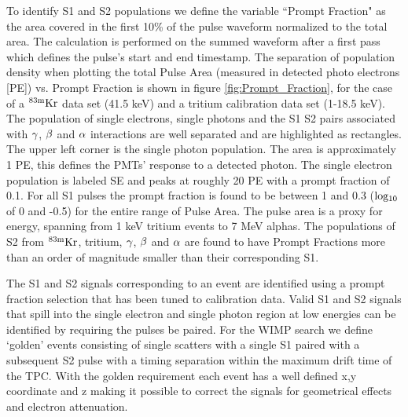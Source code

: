 To identify S1 and S2 populations we define the variable ``Prompt Fraction" as the area covered in the first 10\% of the pulse waveform normalized to the total area. The calculation is performed on the summed waveform after a first pass which defines the pulse's start and end timestamp. 
The separation of population density when plotting the total Pulse Area (measured in detected photo electrons [PE]) vs. Prompt Fraction is shown in figure \ref{fig:Prompt_Fraction},  for the case of a $\rm ^{83m}Kr$ data set (41.5 keV) and a tritium calibration data set (1-18.5 keV). The population of single electrons, single photons and the S1 S2 pairs associated with $\rm \gamma$, $\rm \beta$ and $\rm \alpha$ interactions are well separated and are highlighted as rectangles. The upper left corner is the single photon population. The area is approximately 1 PE, this defines the PMTs' response to a detected photon. The single electron population is labeled SE and peaks at roughly 20 PE with a prompt fraction of 0.1. For all S1 pulses the prompt fraction is found to be between 1 and 0.3 ($\rm log_{10}$ of 0 and -0.5) for the entire range of Pulse Area. The pulse area is a proxy for energy, spanning from 1 keV tritium events to 7 MeV alphas. The populations of S2 from $\rm^{83m}Kr$, tritium, $\rm \gamma$, $\rm \beta$ and $\rm \alpha$ are found to have Prompt Fractions more than an order of magnitude smaller than their corresponding S1. 


The S1 and S2 signals corresponding to an event are identified using a prompt fraction selection that has been tuned to calibration data. Valid S1 and S2 signals that spill into the single electron and single photon region at low energies can be identified by requiring the pulses be paired. For the WIMP search we define `golden' events consisting of single scatters with a single S1 paired with a subsequent S2 pulse with a timing separation within the maximum drift time of the TPC. With the golden requirement each event has a well defined x,y coordinate and z making it possible to correct the signals for geometrical effects and electron attenuation. 

